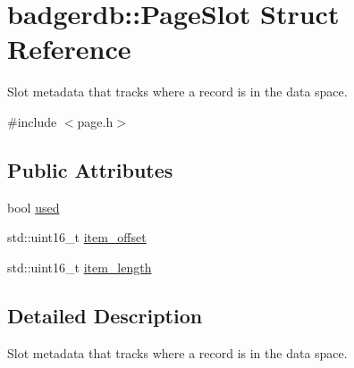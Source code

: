 \hypertarget{structbadgerdb_1_1PageSlot}{\section{badgerdb\-:\-:Page\-Slot Struct Reference}
\label{structbadgerdb_1_1PageSlot}
}


Slot metadata that tracks where a record is in the data space.  




{\ttfamily \#include $<$page.\-h$>$}

\subsection*{Public Attributes}
\begin{DoxyCompactItemize}
\item 
bool \hyperlink{structbadgerdb_1_1PageSlot_a4ea5ad6e73525244bb368181f21fd018}{used}
\item 
std\-::uint16\-\_\-t \hyperlink{structbadgerdb_1_1PageSlot_a81c14b0e942b0d59e6ac31667d958b79}{item\-\_\-offset}
\item 
std\-::uint16\-\_\-t \hyperlink{structbadgerdb_1_1PageSlot_a675118fb03cd9e1b35970a1f10bda9d8}{item\-\_\-length}
\end{DoxyCompactItemize}


\subsection{Detailed Description}
Slot metadata that tracks where a record is in the data space. 

